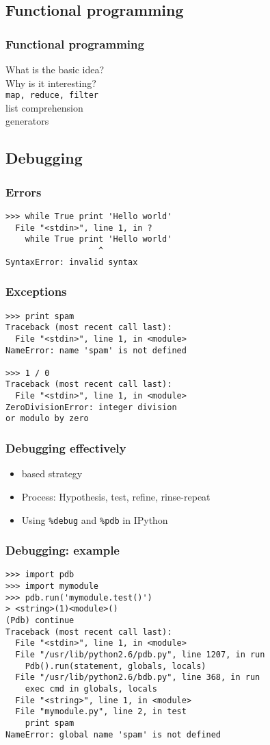 \documentclass[14pt,compress]{beamer}
\newcounter{time}
\newcommand{\inctime}[1]{\addtocounter{time}{#1}{\tiny \thetime\ m}}
\newcommand{\typ}[1]{\texttt{#1}}
\newcommand{\kwrd}[1]{ \texttt{\textbf{\color{blue}{#1}}}  }
\begin{document}
\subsection{Functional programming}
\begin{frame}[fragile]
    \frametitle{Functional programming}
What is the basic idea?\\
Why is it interesting?\\
\typ{map, reduce, filter}\\
list comprehension\\
generators
    \inctime{15} 
\end{frame}

\subsection{Debugging}
\begin{frame}[fragile]
 \frametitle{Errors}
 \begin{lstlisting}
>>> while True print 'Hello world'
  File "<stdin>", line 1, in ?
    while True print 'Hello world'
                   ^
SyntaxError: invalid syntax
\end{lstlisting}
\end{frame}

\begin{frame}[fragile]
 \frametitle{Exceptions}
 \begin{lstlisting}
>>> print spam
Traceback (most recent call last):
  File "<stdin>", line 1, in <module>
NameError: name 'spam' is not defined

>>> 1 / 0
Traceback (most recent call last):
  File "<stdin>", line 1, in <module>
ZeroDivisionError: integer division 
or modulo by zero
\end{lstlisting}
\end{frame}

\begin{frame}[fragile]
    \frametitle{Debugging effectively}

    \begin{itemize}
        \item  \kwrd{print} based strategy
        \item Process: Hypothesis, test, refine, rinse-repeat
        \item Using \typ{\%debug} and \typ{\%pdb} in IPython
    \end{itemize}
    \inctime{15} 
\end{frame}

\begin{frame}[fragile]
\frametitle{Debugging: example}
\small
\begin{lstlisting}
>>> import pdb
>>> import mymodule
>>> pdb.run('mymodule.test()')
> <string>(1)<module>()
(Pdb) continue
Traceback (most recent call last):
  File "<stdin>", line 1, in <module>
  File "/usr/lib/python2.6/pdb.py", line 1207, in run
    Pdb().run(statement, globals, locals)
  File "/usr/lib/python2.6/bdb.py", line 368, in run
    exec cmd in globals, locals
  File "<string>", line 1, in <module>
  File "mymodule.py", line 2, in test
    print spam
NameError: global name 'spam' is not defined
\end{lstlisting}
\end{frame}
\end{document}
